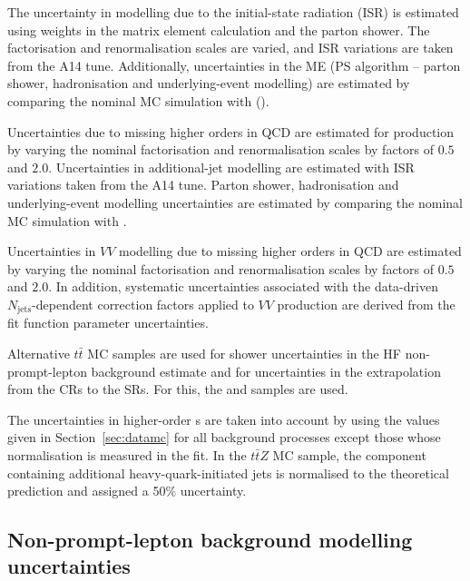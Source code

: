 \documentclass[cernpreprint, atlasdraft=false, texlive=2023, UKenglish, texmf, orcidlogo]{atlasdoc}
\begin{document}
The uncertainty in \ttH modelling due to the initial-state radiation
(ISR) is estimated using weights in the matrix element calculation and
the parton shower. The factorisation and renormalisation scales are
varied, and ISR \alphas variations are taken from the A14 tune.
Additionally, uncertainties in the ME (PS algorithm -- parton shower, hadronisation and underlying-event modelling)
are estimated by comparing the nominal \POWPY[8] MC simulation
with \MGPY[8] (\POWHER[7]).
 
Uncertainties due to missing higher orders in QCD are estimated for
\ttZ production by varying the nominal factorisation and
renormalisation scales by factors of $0.5$ and $2.0$. Uncertainties in
additional-jet modelling are estimated with ISR \alphas
variations taken from the A14 tune. Parton shower,
hadronisation and underlying-event modelling uncertainties are estimated
by comparing the nominal \MGPY[8] MC simulation with
\MGHER[7].
 
Uncertainties in $VV$ modelling due to missing higher orders
in QCD are estimated by varying the nominal factorisation and
renormalisation scales by factors of $0.5$ and $2.0$.
In addition, systematic uncertainties associated with
the data-driven $N_\mathrm{jets}$-dependent correction
factors applied to $VV$ production are derived from
the fit function parameter uncertainties.
 
 
 
 
 
 
 
Alternative $t\bar{t}$ MC samples are used for shower uncertainties in
the HF non-prompt-lepton background estimate and for uncertainties in
the extrapolation from the CRs to the SRs. For this, the \POWHER[7.1.3]
and \SHERPA[2.2.10] samples are used.
 
 
 
 
 
The uncertainties in higher-order \xs{}s are taken into
account by using the values given in
Section~\ref{sec:datamc} for all background processes except
those whose normalisation is measured in the fit.
In the $t\bar{t}Z$ MC sample, the component
containing additional heavy-quark-initiated jets is normalised to the theoretical prediction and assigned a 50\%
uncertainty. 
 
 
\subsection{Non-prompt-lepton background modelling uncertainties}\label{sec:systematics_HF_conv_QmisID}
 
\end{document}
